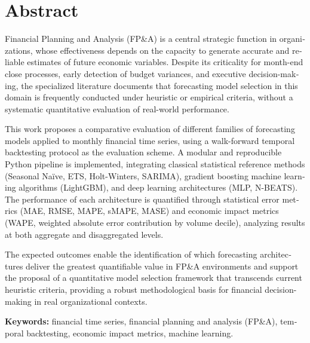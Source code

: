 \clearpage

\chapter*{Abstract}
\thispagestyle{fancy}

\begin{otherlanguage}{english}
Financial Planning and Analysis (FP\&A) is a central strategic function in organizations, whose effectiveness depends on the capacity to generate accurate and reliable estimates of future economic variables. Despite its criticality for month-end close processes, early detection of budget variances, and executive decision-making, the specialized literature documents that forecasting model selection in this domain is frequently conducted under heuristic or empirical criteria, without a systematic quantitative evaluation of real-world performance.

This work proposes a comparative evaluation of different families of forecasting models applied to monthly financial time series, using a walk-forward temporal backtesting protocol as the evaluation scheme. A modular and reproducible Python pipeline is implemented, integrating classical statistical reference methods (Seasonal Naïve, ETS, Holt-Winters, SARIMA), gradient boosting machine learning algorithms (LightGBM), and deep learning architectures (MLP, N-BEATS). The performance of each architecture is quantified through statistical error metrics (MAE, RMSE, MAPE, sMAPE, MASE) and economic impact metrics (WAPE, weighted absolute error contribution by volume decile), analyzing results at both aggregate and disaggregated levels.

The expected outcomes enable the identification of which forecasting architectures deliver the greatest quantifiable value in FP\&A environments and support the proposal of a quantitative model selection framework that transcends current heuristic criteria, providing a robust methodological basis for financial decision-making in real organizational contexts.

\vspace{0.5cm}
\noindent\textbf{Keywords:} financial time series, financial planning and analysis (FP\&A), temporal backtesting, economic impact metrics, machine learning.
\end{otherlanguage}

